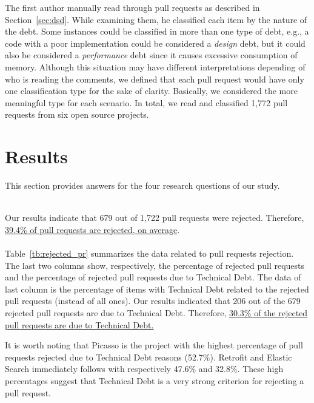 \documentclass{sig-alternate}
\begin{document}
The first author manually read through pull requests as described in Section~\ref{sec:dsd}. 
%
While examining them, he classified each item by the nature of the debt. 
%
Some instances could be classified in more than one type of debt, e.g., a code with a poor implementation could be considered a {\em design} debt, but it could also be considered a {\em performance} debt since it causes excessive consumption of memory. 
%
Although this situation may have different interpretations depending of who is reading the comments, we defined that each pull request would have only one classification type for the sake of clarity. 
%
Basically, we considered the more meaningful type for each scenario. 
%
In total, we read and classified 1,772 pull requests from six open source projects.

\section{Results}
\label{sec:results}
This section provides answers for the four research questions of our study.

\rqi\\[-0.2cm]

Our results indicate that 679 out of 1,722 pull requests were rejected. Therefore, \ul{39.4\% of pull requests are rejected, on average}.\\


\rqii\\[-0.2cm]

Table~\ref{tb:rejected_pr} summarizes the data related to pull requests rejection. 
%
The last two columns show, respectively, the percentage of rejected pull requests and the percentage of rejected pull requests due to Technical Debt. 
%
The data of last column is the percentage of items with Technical Debt related to the rejected pull requests (instead of all ones).
Our results indicated that 206 out of the 679 rejected pull requests are due to Technical Debt. 
Therefore, \ul{30.3\% of the rejected pull requests are due to Technical Debt.}

It is worth noting that
Picasso is the project with the highest percentage of pull requests rejected due to Technical Debt reasons (52.7\%). Retrofit and Elastic Search immediately follows with respectively 47.6\% and 32.8\%. These high percentages suggest that Technical Debt is a very strong criterion for rejecting a pull request.\\
\end{document}
